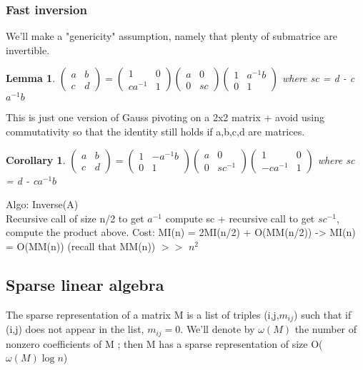 \documentclass{article}
\newtheorem{lemma}{Lemma}
\newtheorem{corollary}{Corollary}
\theoremstyle{definition}
\theoremstyle{remark}
\begin{document}
\subsubsection{Fast inversion}
We'll make a "genericity" assumption, namely that plenty of submatrice are invertible.
\begin{lemma}
	 $\begin{pmatrix}
	 a&b\\c&d
	 \end{pmatrix} = 
	 \begin{pmatrix}
	 	1&0\\ca^{-1}&1
	 \end{pmatrix}
	  \begin{pmatrix}
	  a&0\\0&sc
	  \end{pmatrix}
	   \begin{pmatrix}
	   	1&a^{-1}b\\0&1
	   \end{pmatrix}$ where sc = d - c$a^{-1}b$
\end{lemma}
This is just one version of Gauss pivoting on a 2x2 matrix + avoid using commutativity so that the identity still holds if a,b,c,d are matrices.

\begin{corollary}
	$\begin{pmatrix}
	a&b\\c&d
	\end{pmatrix} = 
	\begin{pmatrix}
	1&-a^{-1}b\\0&1
	\end{pmatrix}
	\begin{pmatrix}
	a&0\\0&sc^{-1}
	\end{pmatrix}
	\begin{pmatrix}
	1&0\\-ca^{-1}&1
	\end{pmatrix}$ where sc = d - c$a^{-1}b$
\end{corollary}
Algo: Inverse(A)\\
Recursive call of size n/2 to get $a^{-1}$ compute sc + recursive call to get $sc^{-1}$, compute the product above.
Cost: MI(n) = 2MI(n/2) + O(MM(n/2)) -> MI(n) = O(MM(n)) (recall that MM(n)) $>>$ $n^2$

\subsection{Sparse linear algebra}
The sparse representation of a matrix M is a list of triples (i,j,$m_{ij}$) such that if (i,j) does not appear in the list, $m_{ij} = 0$.
We'll denote by $\omega(M)$ the number of nonzero coefficients of M ; then M has a sparse representation of size O($\omega(M)\log n$)
\end{document}
